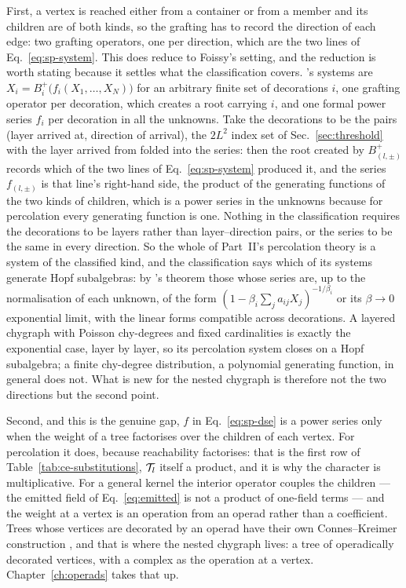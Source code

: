 First, a vertex is reached either from a container or from a member and its
children are of both kinds, so the grafting has to record the direction of
each edge: two grafting operators, one per direction, which are the two
lines of Eq.~\eqref{eq:sp-system}. This does reduce to Foissy's setting,
and the reduction is worth stating because it settles what the
classification covers. \citeauthor{foissy2010}'s systems are
$X_{i}=B^{+}_{i}\bigl(f_{i}(X_{1},\dots,X_{N})\bigr)$ for an arbitrary
finite set of decorations $i$, one grafting operator per decoration,
which creates a root carrying $i$, and one formal power series $f_{i}$
per decoration in all the unknowns. Take the decorations to be the pairs
(layer arrived at, direction of arrival), the $2L^{2}$ index set of
Sec.~\ref{sec:threshold} with the layer arrived from folded into the
series: then the root created by $B^{+}_{(l,\pm)}$ records which of the
two lines of Eq.~\eqref{eq:sp-system} produced it, and the series
$f_{(l,\pm)}$ is that line's right-hand side, the product of the
generating functions of the two kinds of children, which is a power
series in the unknowns because for percolation every generating function
is one. Nothing in the classification requires the decorations to be
layers rather than layer--direction pairs, or the series to be the same
in every direction. So the whole of Part~II's percolation theory is a
system of the classified kind, and the classification says which of its
systems generate Hopf subalgebras: by \citeauthor{foissy2010}'s theorem
those whose series are, up to the normalisation of each unknown, of the
form $(1-\beta_{i}\sum_{j}a_{ij}X_{j})^{-1/\beta_{i}}$ or its
$\beta\to0$ exponential limit, with the linear forms compatible across
decorations. A layered chygraph with Poisson chy-degrees and fixed
cardinalities is exactly the exponential case, layer by layer, so its
percolation system closes on a Hopf subalgebra; a finite chy-degree
distribution, a polynomial generating function, in general does not.
What is new for the nested chygraph is therefore not the two directions
but the second point.

Second, and this is the genuine gap, $f$ in Eq.~\eqref{eq:sp-dse} is a power
series only when the weight of a tree factorises over the children of each
vertex. For percolation it does, because reachability factorises: that is
the first row of Table~\ref{tab:ce-substitutions}, $\mathcal{T}_{l}$ itself a
product, and it is why the character is multiplicative. For a general kernel
the interior operator couples the children --- the emitted field of
Eq.~\eqref{eq:emitted} is not a product of one-field terms --- and the
weight at a vertex is an operation from an operad rather than a coefficient.
Trees whose vertices are decorated by an operad have their own
Connes--Kreimer construction \citep{moerdijk2001,vanderlaan2003}, and that is
where the nested chygraph lives: a tree of operadically decorated vertices,
with a complex as the operation at a vertex. Chapter~\ref{ch:operads} takes
that up.

